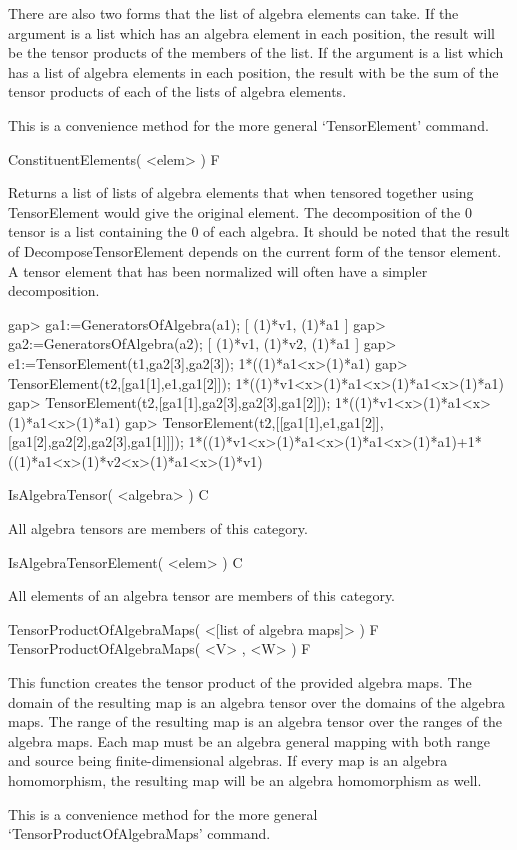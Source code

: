 There are also two forms that the list of algebra elements can take.
If the argument is a list which has an algebra element in each position, the result will be the tensor products of the members of the list.
If the argument is a list which has a list of algebra elements in each position, the result with be the sum of the tensor products of each of the lists of algebra elements.


This is a convenience method for the more general `TensorElement' command.

\>ConstituentElements( <elem> ) F

Returns a list of lists of algebra elements that when tensored together using TensorElement would give the original element.
The decomposition of the $0$ tensor is a list containing the $0$ of each algebra.
It should be noted that the result of DecomposeTensorElement depends on the current form of the tensor element.
A tensor element that has been normalized will often have a simpler decomposition.

\beginexample
gap> ga1:=GeneratorsOfAlgebra(a1);
[ (1)*v1, (1)*a1 ]
gap> ga2:=GeneratorsOfAlgebra(a2);
[ (1)*v1, (1)*v2, (1)*a1 ]
gap> e1:=TensorElement(t1,ga2[3],ga2[3]);
1*((1)*a1<x>(1)*a1)
gap> TensorElement(t2,[ga1[1],e1,ga1[2]]);
1*((1)*v1<x>(1)*a1<x>(1)*a1<x>(1)*a1)
gap> TensorElement(t2,[ga1[1],ga2[3],ga2[3],ga1[2]]);
1*((1)*v1<x>(1)*a1<x>(1)*a1<x>(1)*a1)
gap> TensorElement(t2,[[ga1[1],e1,ga1[2]],[ga1[2],ga2[2],ga2[3],ga1[1]]]);
1*((1)*v1<x>(1)*a1<x>(1)*a1<x>(1)*a1)+1*((1)*a1<x>(1)*v2<x>(1)*a1<x>(1)*v1)
\endexample


\>IsAlgebraTensor( <algebra> ) C

All algebra tensors are members of this category.

\>IsAlgebraTensorElement( <elem> ) C

All elements of an algebra tensor are members of this category.


\>TensorProductOfAlgebraMaps( <[list of algebra maps]> ) F
\>TensorProductOfAlgebraMaps( <V> , <W> ) F

This function creates the tensor product of the provided algebra maps.
The domain of the resulting map is an algebra tensor over the domains of the algebra maps.
The range of the resulting map is an algebra tensor over the ranges of the algebra maps.
Each map must be an algebra general mapping with both range and source being finite-dimensional algebras.
If every map is an algebra homomorphism, the resulting map will be an algebra homomorphism as well.

This is a convenience method for the more general `TensorProductOfAlgebraMaps' command.
